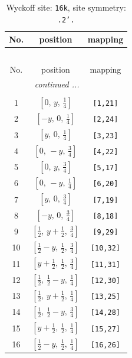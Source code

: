 \documentclass[fleqn,8pt]{jsarticle}
\begin{document}
\renewcommand{\arraystretch}{1.2}
\begin{longtable}{ccc}
\caption{Wyckoff site: {\tt 16k}, site symmetry: {\tt .2'.}}
 \\
 \hline \hline
No. & position & mapping \\ \hline \endfirsthead

\multicolumn{2}{l}{\tablename\ \thetable{}} \\
 \hline \hline
No. & position & mapping \\ \hline \endhead

 \hline \hline
\multicolumn{2}{r}{\footnotesize\it continued ...} \\ \endfoot

 \hline \hline
\multicolumn{2}{r}{} \\ \endlastfoot

1 & $\left[ 0,\, y,\, \frac{1}{4} \right]$ & {\tt [1,21]} \\ \hline
2 & $\left[ - y,\, 0,\, \frac{1}{4} \right]$ & {\tt [2,24]} \\ \hline
3 & $\left[ y,\, 0,\, \frac{1}{4} \right]$ & {\tt [3,23]} \\ \hline
4 & $\left[ 0,\, - y,\, \frac{3}{4} \right]$ & {\tt [4,22]} \\ \hline
5 & $\left[ 0,\, y,\, \frac{3}{4} \right]$ & {\tt [5,17]} \\ \hline
6 & $\left[ 0,\, - y,\, \frac{1}{4} \right]$ & {\tt [6,20]} \\ \hline
7 & $\left[ y,\, 0,\, \frac{3}{4} \right]$ & {\tt [7,19]} \\ \hline
8 & $\left[ - y,\, 0,\, \frac{3}{4} \right]$ & {\tt [8,18]} \\ \hline
9 & $\left[ \frac{1}{2},\, y + \frac{1}{2},\, \frac{3}{4} \right]$ & {\tt [9,29]} \\ \hline
10 & $\left[ \frac{1}{2} - y,\, \frac{1}{2},\, \frac{3}{4} \right]$ & {\tt [10,32]} \\ \hline
11 & $\left[ y + \frac{1}{2},\, \frac{1}{2},\, \frac{3}{4} \right]$ & {\tt [11,31]} \\ \hline
12 & $\left[ \frac{1}{2},\, \frac{1}{2} - y,\, \frac{1}{4} \right]$ & {\tt [12,30]} \\ \hline
13 & $\left[ \frac{1}{2},\, y + \frac{1}{2},\, \frac{1}{4} \right]$ & {\tt [13,25]} \\ \hline
14 & $\left[ \frac{1}{2},\, \frac{1}{2} - y,\, \frac{3}{4} \right]$ & {\tt [14,28]} \\ \hline
15 & $\left[ y + \frac{1}{2},\, \frac{1}{2},\, \frac{1}{4} \right]$ & {\tt [15,27]} \\ \hline
16 & $\left[ \frac{1}{2} - y,\, \frac{1}{2},\, \frac{1}{4} \right]$ & {\tt [16,26]} \\
\end{longtable}
\end{document}
